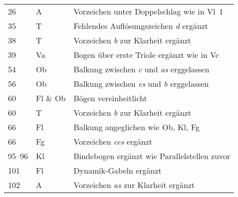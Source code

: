 \documentclass[paper=A3,12pt]{scrartcl}
\newcommand{\note}[1]{\textsl{#1}}
\begin{document}
\begin{center}
\begin{tabular}{lll}
26 & A & Vorzeichen unter Doppelschlag wie in Vl~1\\
35 & T & Fehlendes Auflösungszeichen \note{d} ergänzt\\
38 & T & Vorzeichen \note{b} zur Klarheit ergänzt\\
39 & Va & Bogen über erste Triole ergänzt wie in Vc\\
54 & Ob & Balkung zwischen \note{c} und \note{as} erggelassen\\
56 & Ob & Balkung zwischen \note{es} und \note{b} erggelassen\\
60 & Fl \& Ob & Bögen vereinheitlicht\\
60 & T & Vorzeichen \note{b} zur Klarheit ergänzt\\
66 & Fl & Balkung angeglichen wie Ob, Kl, Fg\\
66 & Fg & Vorzeichen \note{ces} ergänzt\\
95--96 & Kl & Bindebogen ergänzt wie Parallelstellen zuvor\\
101 & Fl & Dynamik-Gabeln ergänzt\\
102 & A & Vorzeichen \note{as} zur Klarheit ergänzt\\

\bottomrule
\end{tabular}

\setlength{}  %
\printbibliography[heading=bibnumbered]

\end{center}
\end{document}
